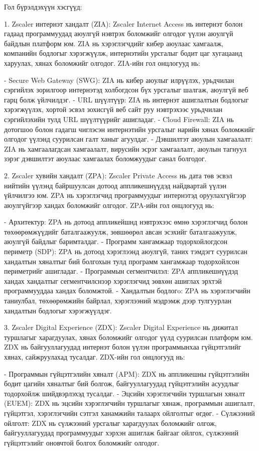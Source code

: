					Гол бүрэлдэхүүн хэсгүүд:
					
					1. Zscaler интернэт хандалт (ZIA): Zscaler Internet Access нь интернэт болон гадаад программуудад аюулгүй нэвтрэх боломжийг олгодог үүлэн аюулгүй байдлын платформ юм. ZIA нь хэрэглэгчдийг кибер аюулаас хамгаалж, компанийн бодлогыг хэрэгжүүлж, интернэтийн урсгалыг бодит цаг хугацаанд харуулах, хянах боломжийг олгодог. ZIA-ийн гол онцлогууд нь:
					
							- Secure Web Gateway (SWG): ZIA нь кибер аюулыг илрүүлэх, урьдчилан сэргийлэх зорилгоор интернэтэд холбогдсон бүх урсгалыг шалгаж, аюулгүй веб гарц болж үйлчилдэг.
							- URL шүүлтүүр: ZIA нь интернэт ашиглалтын бодлогыг хэрэгжүүлэх, хортой эсвэл зохисгүй веб сайт руу нэвтрэхээс урьдчилан сэргийлэхийн тулд URL шүүлтүүрийг ашигладаг.
							- Cloud Firewall: ZIA нь дотогшоо болон гадагш чиглэсэн интернэтийн урсгалыг нарийн хянах боломжийг олгодог үүлэнд суурилсан галт ханыг агуулдаг.
							- Дэвшилтэт аюулын хамгаалалт: ZIA нь хамгаалагдсан хамгаалалт, вирусийн эсрэг хамгаалалт, аюулын тагнуул зэрэг дэвшилтэт аюулаас хамгаалах боломжуудыг санал болгодог.
					
					2. Zscaler хувийн хандалт (ZPA): Zscaler Private Access нь дата төв эсвэл нийтийн үүлэнд байршуулсан дотоод аппликешнүүдэд найдвартай үүлэн үйлчилгээ юм. ZPA нь хэрэглэгчид программуудыг интернэтэд оруулахгүйгээр аюулгүйгээр хандах боломжийг олгодог. ZPA-ийн гол онцлогууд нь:
					
							- Архитектур: ZPA нь дотоод аппликейшнд нэвтрэхээс өмнө хэрэглэгчид болон төхөөрөмжүүдийг баталгаажуулж, зөвшөөрөл авсан эсэхийг баталгаажуулж, аюулгүй байдлыг баримталдаг.
							- Программ хангамжаар тодорхойлогдсон периметр (SDP): ZPA нь дотоод хэрэглээнд аюулгүй, таних тэмдэгт суурилсан хандалтын хяналтыг бий болгохын тулд программ хангамжаар тодорхойлсон периметрийг ашигладаг.
							- Программын сегментчилэл: ZPA аппликешнүүдэд хандах хандалтыг сегментчилснээр хэрэглэгчид зөвхөн ашиглах эрхтэй программууддаа хандах боломжтой.
							- Хандалтын бодлогo: ZPA нь хэрэглэгчийн таниулбал, төхөөрөмжийн байрлал, хэрэглээний мэдрэмж дээр тулгуурлан хандалтын бодлогыг хэрэгжүүлдэг.
					
					3. Zscaler Digital Experience (ZDX): Zscaler Digital Experience нь дижитал туршлагыг харагдуулах, хянах боломжийг олгодог үүлд суурилсан платформ юм. ZDX нь байгууллагуудад интернэт болон үүлэн программынхаа гүйцэтгэлийг хянах, сайжруулахад тусалдаг. ZDX-ийн гол онцлогууд нь:
					
							- Программын гүйцэтгэлийн хяналт (APM): ZDX нь аппликешны гүйцэтгэлийн бодит цагийн хяналтыг бий болгож, байгууллагуудад гүйцэтгэлийн асуудлыг тодорхойлж шийдвэрлэхэд тусалдаг.
							- Эцсийн хэрэглэгчийн туршлагын хяналт (EUEM): ZDX нь эцсийн хэрэглэгчийн туршлагыг хянаж, программын ашиглалт, гүйцэтгэл, хэрэглэгчийн сэтгэл ханамжийн талаарх ойлголтыг өгдөг.
							- Сүлжээний ойлголт: ZDX нь сүлжээний урсгалыг харагдуулах боломжийг олгож, байгууллагуудад программуудыг хэрхэн ашиглаж байгааг ойлгох, сүлжээний гүйцэтгэлийг оновчтой болгох боломжийг олгодог.
					
